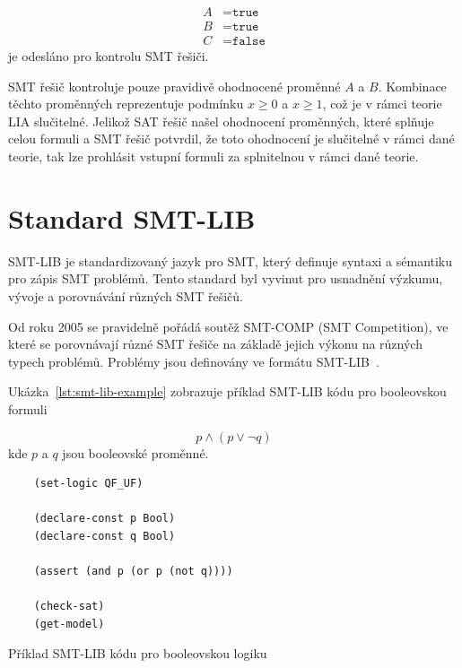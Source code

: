 \begin{align*}
    A &= \texttt{true} \\
    B &= \texttt{true} \\
    C &= \texttt{false}
\end{align*}
je odesláno pro kontrolu SMT řešiči.

SMT řešič kontroluje pouze pravidivě ohodnocené proměnné $A$ a $B$.
Kombinace těchto proměnných reprezentuje podmínku $x \geq 0$ a $x \geq 1$,
což je v rámci teorie LIA slučitelné.
Jelikož SAT řešič našel ohodnocení proměnných, které splňuje celou formuli
a SMT řešič potvrdil, že toto ohodnocení je slučitelné v rámci dané teorie,
tak lze prohlásit vstupní formuli za splnitelnou v rámci dané teorie.

\section{Standard SMT-LIB}
\label{sec:smt-lib}

SMT-LIB je standardizovaný jazyk pro SMT, který definuje syntaxi a sémantiku pro zápis SMT problémů.
Tento standard byl vyvinut pro usnadnění výzkumu, vývoje a porovnávání různých SMT řešičů.

Od roku 2005 se pravidelně pořádá soutěž SMT-COMP (SMT Competition),
ve které se porovnávají různé SMT řešiče na základě jejich výkonu na různých typech problémů.
Problémy jsou definovány ve formátu SMT-LIB~\cite{SMTCOMP}.

Ukázka~\ref{lst:smt-lib-example} zobrazuje příklad SMT-LIB kódu pro booleovskou formuli

\begin{equation*}
    p \land (p \lor \neg q)
\end{equation*}
kde $p$ a $q$ jsou booleovské proměnné.

\begin{listing}[H]
    \begin{verbatim}
    (set-logic QF_UF)

    (declare-const p Bool)
    (declare-const q Bool)

    (assert (and p (or p (not q))))

    (check-sat)
    (get-model)
    \end{verbatim}
    \caption{Příklad SMT-LIB kódu pro booleovskou logiku}
    \label{lst:smt-lib-example}
\end{listing}

